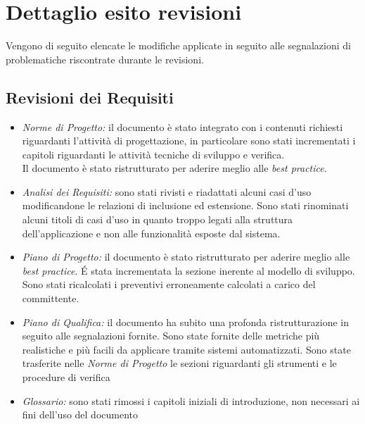 \section{Dettaglio esito revisioni}
Vengono di seguito elencate le modifiche applicate in seguito alle segnalazioni di problematiche riscontrate durante le revisioni. 

\subsection{Revisioni dei Requisiti}
\begin{itemize}
\item \emph{Norme di Progetto: }il documento è stato integrato con i contenuti richiesti riguardanti l'attività di progettazione, in particolare sono stati incrementati i capitoli riguardanti le attività tecniche di sviluppo e verifica.\\
Il documento è stato ristrutturato per aderire meglio alle \emph{best practice}. 

\item \emph{Analisi dei Requisiti: }sono stati rivisti e riadattati alcuni casi d'uso modificandone le relazioni di inclusione ed estensione. Sono stati rinominati alcuni titoli di casi d'uso in quanto troppo legati alla struttura dell'applicazione e non alle funzionalità esposte dal sistema.

\item \emph{Piano di Progetto: }il documento è stato ristrutturato per aderire meglio alle \emph{best practice}. É stata incrementata la sezione inerente al modello di sviluppo. Sono stati ricalcolati i preventivi erroneamente calcolati a carico del committente.

\item \emph{Piano di Qualifica: }il documento ha subito una profonda ristrutturazione in seguito alle segnalazioni fornite. Sono state fornite delle metriche più realistiche e più facili da applicare tramite sistemi automatizzati. Sono state trasferite nelle \emph{Norme di Progetto} le sezioni riguardanti gli strumenti e le procedure di verifica

\item \emph{Glossario: }sono stati rimossi i capitoli iniziali di introduzione, non necessari ai fini dell'uso del documento

\end{itemize}

